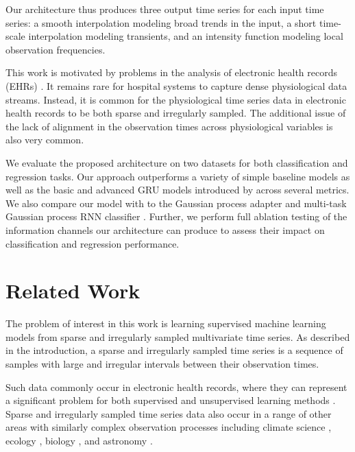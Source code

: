 \documentclass{article} \usepackage{iclr2019_conference,times}
\begin{document}
Our architecture thus produces three 
output time series for each input time series: a smooth
interpolation modeling broad trends in the input, a short 
time-scale interpolation modeling transients, and an intensity
function modeling local observation frequencies. 

This work is motivated by problems in the analysis of electronic health records (EHRs)
\citep{marlin-ihi2012, lipton2016directly, futoma2017improved, che2016recurrent}.
It remains rare for hospital systems to capture dense physiological
data streams. Instead, it is common for the physiological time series data in electronic health records
to be both sparse and irregularly sampled.
The additional issue of the lack of alignment in the observation times
across physiological variables is also very common.

We evaluate the proposed architecture on two datasets for both classification and regression tasks.
Our approach outperforms a variety of simple baseline
models as well as the basic and advanced GRU models introduced by 
\citet{che2016recurrent} across several metrics. We also compare our model with to the Gaussian process adapter \citep{li2016scalable} and multi-task Gaussian process RNN classifier \citep{futoma2017improved}. 
Further, we perform full ablation testing of the information channels 
our architecture can produce to assess their impact on classification
and regression performance. 
%
 

\section{Related Work}
\label{sec:related}

The problem of interest in this work is learning supervised 
machine learning models from sparse and irregularly sampled
multivariate time series. As described in the introduction,
a sparse and irregularly sampled time series is a sequence of 
samples with large and irregular intervals between their 
observation times. 

Such data commonly occur in electronic 
health records, where they can represent a significant problem 
for both supervised and unsupervised learning methods \citep{yadav2018mining}.
Sparse and irregularly sampled time series data also 
occur in a range of other areas with similarly complex
observation processes including
climate science \citep{schulz1997spectrum},
ecology \citep{clark2004population},
biology \citep{ruf1999lomb},
and astronomy \citep{scargle-astro1982}. 
\end{document}
